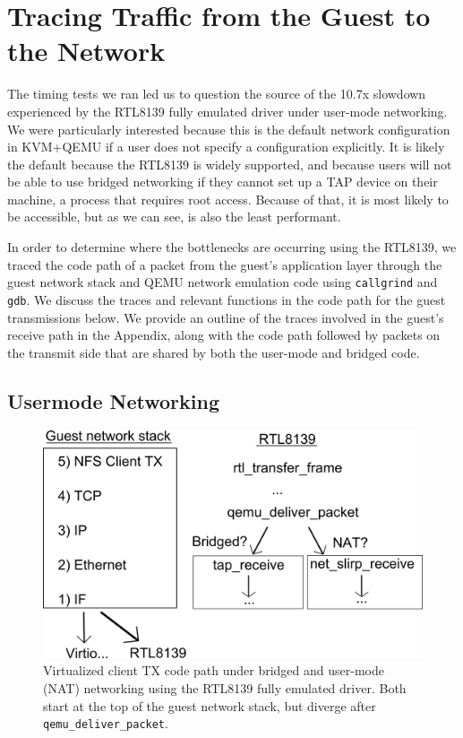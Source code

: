 \section{Tracing Traffic from the Guest to the Network}
\label{sec:trace}
The timing tests we ran led us to question the source of the 10.7x slowdown experienced by the RTL8139 fully emulated driver under user-mode networking. We were particularly interested because this is the default network configuration in KVM+QEMU if a user does not specify a configuration explicitly. It is likely the default because the RTL8139 is widely supported, and because users will not be able to use bridged networking if they cannot set up a TAP device on their machine, a process that requires root access. Because of that, it is most likely to be accessible, but as we can see, is also the least performant.

In order to determine where the bottlenecks are occurring using the RTL8139, we traced the code path of a packet from the guest's application layer through the guest network stack and QEMU network emulation code using \texttt{callgrind} and \texttt{gdb}. We discuss the traces and relevant functions in the code path for the guest transmissions below. We provide an outline of the traces involved in the guest's receive path in the Appendix, along with the code path followed by packets on the transmit side that are shared by both the user-mode and bridged code. 

\subsection{Usermode Networking}
\label{subsec:usermode}

\begin{figure}[!ht]
	\centering
		\includegraphics[scale=0.6]{codepath1}
	\caption{Virtualized client TX code path under bridged and user-mode (NAT) networking using the RTL8139 fully emulated driver. Both start at the top of the guest network stack, but diverge after \texttt{qemu\_deliver\_packet}.}
	\label{fig:codepath1}
\end{figure}

